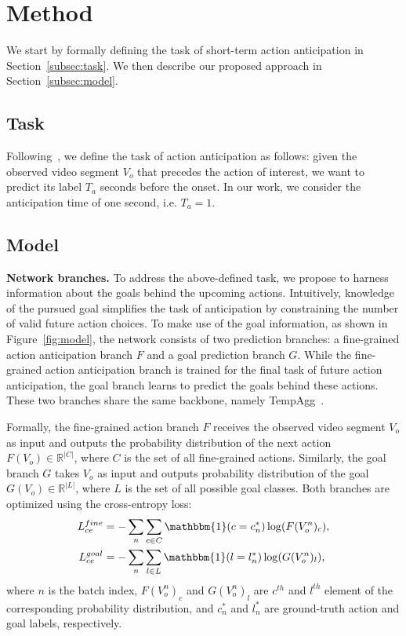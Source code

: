 \documentclass{article}
\begin{document}
\vspace{-0.2cm}
\section{Method}
\vspace{-0.1cm}
\label{sec:method}
We start by formally defining the task of short-term action anticipation in Section~\ref{subsec:task}. We then describe our proposed approach in Section~\ref{subsec:model}. 
\vspace{-0.3cm}
\subsection{Task}
\vspace{-0.1cm}
\label{subsec:task}
Following~\cite{sener2020temporal, furnari2020rulstm}, we define the task of action anticipation as follows: given the observed video segment $V_o$ that precedes the action of interest, we want to predict its label $T_a$ seconds before the onset. In our work, we consider the anticipation time of one second, i.e. $T_a = 1$.
\vspace{-0.2cm}
\subsection{Model}
\vspace{-0.1cm}
\label{subsec:model}
\textbf{Network branches.} To address the above-defined task, we propose to harness information about the goals behind the upcoming actions. Intuitively, knowledge of the pursued goal simplifies the task of anticipation by constraining the number of valid future action choices.
To make use of the goal information, as shown in Figure~\ref{fig:model}, the network consists of two prediction branches: a fine-grained action anticipation branch $F$ and a goal prediction branch $G$. 
While the fine-grained action anticipation branch is trained for the final task of future action anticipation, the goal branch learns to predict the goals behind these actions. These two branches share the same backbone, namely TempAgg~\cite{sener2020temporal}.

Formally, the fine-grained action branch $F$ receives the observed video segment $V_o$ as input and outputs the probability distribution of the next action $F(V_o) \in \mathbb{R}^{|C|}$, where $C$ is the set of all fine-grained actions. Similarly, the goal branch $G$ takes $V_o$ as input and outputs probability distribution of the goal $G(V_o) \in \mathbb{R}^{|L|}$, where $L$ is the set of all possible goal classes. Both branches are optimized using the cross-entropy loss:
\begin{align}
    L_{ce}^{fine} &= -\sum_{n}\sum_{c \in C} \mathbbm{1}(c = c^*_n) \log(F(V_o^n)_c), \\
    L_{ce}^{goal} &= -\sum_{n}\sum_{l \in L} \mathbbm{1}(l = l^*_n) \log(G(V_o^n)_l),
\end{align}
where $n$ is the batch index, $F(V_o^n)_c$ and $G(V_o^n)_l$ are $c^{th}$ and $l^{th}$ element of the corresponding probability distribution, and $c^*_n$ and $l^*_n$ are ground-truth action and goal labels, respectively.
\end{document}
